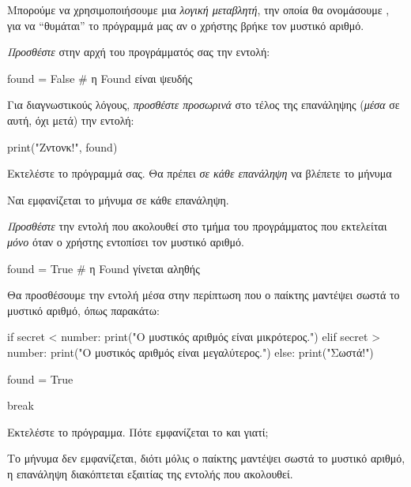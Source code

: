\documentclass[a4paper,11pt,oneside]{book}
\begin{document}
\begin{step}
Μπορούμε να χρησιμοποιήσουμε μια \emph{λογική μεταβλητή}, την οποία θα ονομάσουμε , για να ``θυμάται'' το πρόγραμμά μας αν ο χρήστης βρήκε τον μυστικό αριθμό.

\emph{Προσθέστε} στην αρχή του προγράμματός σας την εντολή:

\begin{pynew}
found = False    # η Found είναι ψευδής
\end{pynew}

Για διαγνωστικούς λόγους, \emph{προσθέστε προσωρινά} στο τέλος της επανάληψης (\emph{μέσα} σε αυτή, όχι μετά) την εντολή:

\begin{pynew}
print("Ζντονκ!", found)
\end{pynew}

Εκτελέστε το πρόγραμμά σας. Θα πρέπει \emph{σε κάθε επανάληψη} να βλέπετε το μήνυμα 

\begin{answer}
Ναι εμφανίζεται το μήνυμα σε κάθε επανάληψη.
\end{answer}
\end{step}

\begin{step}
\emph{Προσθέστε} την εντολή που ακολουθεί στο τμήμα του προγράμματος που εκτελείται \emph{μόνο} όταν ο χρήστης εντοπίσει τον μυστικό αριθμό.

\begin{pynew}
found = True    # η Found γίνεται αληθής
\end{pynew}

\begin{answer}
Θα προσθέσουμε την εντολή μέσα στην περίπτωση που ο παίκτης μαντέψει σωστά το μυστικό αριθμό, όπως παρακάτω:

\begin{pyplain}
    if secret < number:
        print("Ο μυστικός αριθμός είναι μικρότερος.")
    elif secret > number:
        print("Ο μυστικός αριθμός είναι μεγαλύτερος.")
    else:
        print("Σωστά!")
\end{pyplain}
\begin{pynew}
        found = True
\end{pynew}
\begin{pyplain}
        break
\end{pyplain}
\end{answer}

Εκτελέστε το πρόγραμμα. Πότε εμφανίζεται το  και γιατί;

\begin{answer}
Το μήνυμα δεν εμφανίζεται, διότι μόλις ο παίκτης μαντέψει σωστά το μυστικό αριθμό, η επανάληψη διακόπτεται εξαιτίας της εντολής  που ακολουθεί.
\end{answer}
\end{step}
\end{document}
